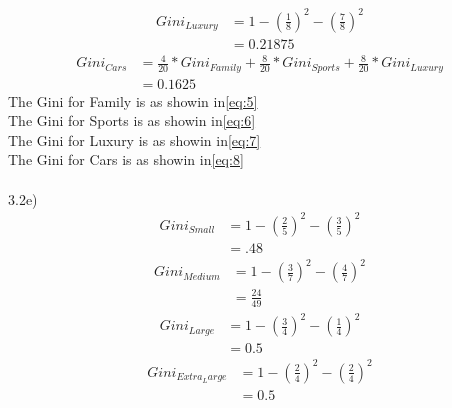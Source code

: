 \documentclass[12pt,english]{article}
\begin{document}
\begin{equation}\tag{3}\label{eq:6}
\begin{split}
Gini_{Luxury} &= 1- (\frac{1}{8})^{2} - (\frac{7}{8})^{2}\\
&=0.21875
\end{split}
\end{equation}
\begin{equation}\tag{4}\label{eq:7}
\begin{split}
Gini_{Cars} &= \frac{4}{20}*Gini_{Family} + \frac{8}{20}*Gini_{Sports}+ \frac{8}{20}*Gini_{Luxury}\\
&=0.1625
\end{split}
\end{equation}
The Gini for Family is as showin in\eqref{eq:5}\\
The Gini for Sports is as showin in\eqref{eq:6}\\
The Gini for Luxury is as showin in\eqref{eq:7}\\
The Gini for Cars is as showin in\eqref{eq:8}\\ \\
3.2e)\\
\begin{equation}\tag{1}\label{eq:9}
\begin{split}
Gini_{Small} &= 1- (\frac{2}{5})^{2} - (\frac{3}{5})^{2}\\
&=.48
\end{split}
\end{equation}
\begin{equation}\tag{2}\label{eq:10}
\begin{split}
Gini_{Medium} &= 1- (\frac{3}{7})^{2} - (\frac{4}{7})^{2}\\
&=\frac{24}{49}
\end{split}
\end{equation}
\begin{equation}\tag{3}\label{eq:11}
\begin{split}
Gini_{Large} &= 1- (\frac{3}{4})^{2} - (\frac{1}{4})^{2}\\
&=0.5
\end{split}
\end{equation}
\begin{equation}\tag{4}\label{eq:12}
\begin{split}
Gini_{Extra_Large} &= 1- (\frac{2}{4})^{2} - (\frac{2}{4})^{2}\\
&=0.5
\end{split}
\end{equation}
\end{document}
